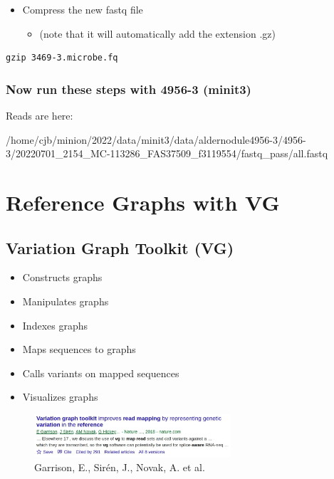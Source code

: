 \documentclass[
]{book}
\providecommand{\tightlist}{%
  \setlength{\itemsep}{0pt}\setlength{\parskip}{0pt}}
\begin{document}
\begin{itemize}
\tightlist
\item
  Compress the new fastq file

  \begin{itemize}
  \tightlist
  \item
    (note that it will automatically add the extension .gz)
  \end{itemize}
\end{itemize}

\begin{verbatim}
gzip 3469-3.microbe.fq
\end{verbatim}

\hypertarget{now-run-these-steps-with-4956-3-minit3}{%
\subsection*{Now run these steps with 4956-3 (minit3)}\label{now-run-these-steps-with-4956-3-minit3}}

Reads are here:

/home/cjb/minion/2022/data/minit3/data/aldernodule4956-3/4956-3/20220701\_2154\_MC-113286\_FAS37509\_f3119554/fastq\_pass/all.fastq

\hypertarget{reference-graphs-with-vg}{%
\chapter{Reference Graphs with VG}\label{reference-graphs-with-vg}}

\hypertarget{variation-graph-toolkit-vg}{%
\section{Variation Graph Toolkit (VG)}\label{variation-graph-toolkit-vg}}

\begin{itemize}
\tightlist
\item
  Constructs graphs
\item
  Manipulates graphs
\item
  Indexes graphs
\item
  Maps sequences to graphs
\item
  Calls variants on mapped sequences
\item
  Visualizes graphs
\end{itemize}

\begin{figure}
\centering
\includegraphics[width=0.65\textwidth,height=\textheight]{./Figures/VGref.png}
\caption{Garrison, E., Sirén, J., Novak, A. et al.}
\end{figure}
\end{document}
